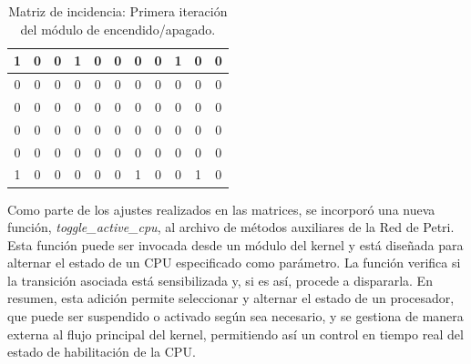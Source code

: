 \begin{table}[H]
    \centering
    \begin{tabular}{|c|c|c|c|c|c|c|c|c|c|c|}
        \hline
        1                      & 0                      & 0                      & 1                      & 0                      & 0                      & 0                      & 0                      & 1                      & \cellcolor{lightgray}0 & \cellcolor{lightgray}0 \\
        \hline
        0                      & 0                      & 0                      & 0                      & 0                      & 0                      & 0                      & 0                      & 0                      & \cellcolor{lightgray}0 & \cellcolor{lightgray}0 \\
        \hline
        0                      & 0                      & 0                      & 0                      & 0                      & 0                      & 0                      & 0                      & 0                      & \cellcolor{lightgray}0 & \cellcolor{lightgray}0 \\
        \hline
        0                      & 0                      & 0                      & 0                      & 0                      & 0                      & 0                      & 0                      & 0                      & \cellcolor{lightgray}0 & \cellcolor{lightgray}0 \\
        \hline
        0                      & 0                      & 0                      & 0                      & 0                      & 0                      & 0                      & 0                      & 0                      & \cellcolor{lightgray}0 & \cellcolor{lightgray}0 \\
        \hline
        \cellcolor{lightgray}1 & \cellcolor{lightgray}0 & \cellcolor{lightgray}0 & \cellcolor{lightgray}0 & \cellcolor{lightgray}0 & \cellcolor{lightgray}0 & \cellcolor{lightgray}1 & \cellcolor{lightgray}0 & \cellcolor{lightgray}0 & \cellcolor{lightgray}1 & \cellcolor{lightgray}0 \\
        \hline
    \end{tabular}
    \caption{Matriz de incidencia: Primera iteración del módulo de encendido/apagado.}
    \label{tabla:matriz_incidencia_post}
\end{table}

Como parte de los ajustes realizados en las matrices, se incorporó una nueva función, \textit{toggle\_active\_cpu}, al archivo de métodos auxiliares de la Red de Petri. Esta función puede ser invocada desde un módulo del kernel y está diseñada para alternar el estado de un CPU especificado como parámetro. La función verifica si la transición asociada está sensibilizada y, si es así, procede a dispararla. En resumen, esta adición permite seleccionar y alternar el estado de un procesador, que puede ser suspendido o activado según sea necesario, y se gestiona de manera externa al flujo principal del kernel, permitiendo así un control en tiempo real del estado de habilitación de la CPU.\par


